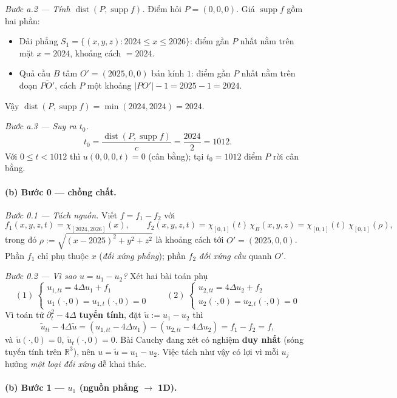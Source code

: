 \emph{Bước a.2 --- Tính $\operatorname{dist}(P,\operatorname{supp} f)$.} Điểm hỏi $P=(0,0,0)$. Giá $\operatorname{supp} f$ gồm hai phần:
\begin{itemize}
\item Dải phẳng $S_1=\{(x,y,z):2024\le x\le2026\}$: điểm gần $P$ nhất nằm trên mặt $x=2024$, khoảng cách $=2024$.
\item Quả cầu $B$ tâm $O'=(2025,0,0)$ bán kính $1$: điểm gần $P$ nhất nằm trên đoạn $\overline{PO'}$, cách $P$ một khoảng $|PO'|-1=2025-1=2024$.
\end{itemize}
Vậy $\operatorname{dist}(P,\operatorname{supp} f)=\min(2024,2024)=2024$.

\emph{Bước a.3 --- Suy ra $t_0$.}
\[
  t_0=\frac{\operatorname{dist}(P,\operatorname{supp} f)}{c}=\frac{2024}{2}=1012.
\]
Với $0\le t<1012$ thì $u(0,0,0,t)=0$ (cân bằng); tại $t_0=1012$ điểm $P$ rời cân bằng.

\paragraph{(b) Bước 0 --- chồng chất.}\leavevmode

\emph{Bước 0.1 --- Tách nguồn.} Viết $f=f_1-f_2$ với
\[
  f_1(x,y,z,t)=\chi_{[2024,2026]}(x),\qquad
  f_2(x,y,z,t)=\chi_{[0,1]}(t)\,\chi_B(x,y,z)=\chi_{[0,1]}(t)\,\chi_{[0,1]}(\rho),
\]
trong đó $\rho:=\sqrt{(x-2025)^2+y^2+z^2}$ là khoảng cách tới $O'=(2025,0,0)$. Phần $f_1$ chỉ phụ thuộc $x$ (\emph{đối xứng phẳng}); phần $f_2$ \emph{đối xứng cầu} quanh $O'$.

\emph{Bước 0.2 --- Vì sao $u=u_1-u_2$?} Xét hai bài toán phụ
\[
  (1)\ \begin{cases}u_{1,tt}=4\Delta u_1+f_1\\ u_1(\cdot,0)=u_{1,t}(\cdot,0)=0\end{cases}
  \qquad
  (2)\ \begin{cases}u_{2,tt}=4\Delta u_2+f_2\\ u_2(\cdot,0)=u_{2,t}(\cdot,0)=0\end{cases}
\]
Vì toán tử $\partial_t^2-4\Delta$ \textbf{tuyến tính}, đặt $\tilde u:=u_1-u_2$ thì
\[
  \tilde u_{tt}-4\Delta\tilde u=(u_{1,tt}-4\Delta u_1)-(u_{2,tt}-4\Delta u_2)=f_1-f_2=f,
\]
và $\tilde u(\cdot,0)=0$, $\tilde u_t(\cdot,0)=0$. Bài Cauchy đang xét có nghiệm \textbf{duy nhất} (sóng tuyến tính trên $\mathbb{R}^3$), nên $u=\tilde u=u_1-u_2$. Việc tách như vậy có lợi vì mỗi $u_j$ hưởng \emph{một loại đối xứng} dễ khai thác.

\paragraph{(b) Bước 1 --- $u_1$ (nguồn phẳng $\to$ 1D).}\leavevmode

